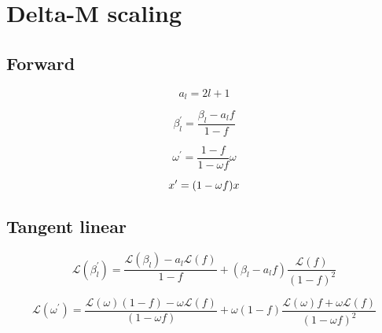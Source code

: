 %
\section{Delta-M scaling}
\label{sec:delta_m_scaling}


\subsection{Forward}
\label{sec:delta_m_scaling-forward}

\begin{equation}
a_{l} = 2 l + 1
\label{eq:delta_m_scaling-forward-a}
\end{equation}

\begin{equation}
\beta^{\prime}_{l} = \frac{\beta_{l} - a_{l}f}{1 - f}
\label{eq:delta_m_scaling-forward-chi}
\end{equation}

\begin{equation}
\omega^{\prime} = \frac{1 - f}{1 - {\omega}f}\omega
\label{eq:delta_m_scaling-forward-omega}
\end{equation}

\begin{equation}
x^{\prime} = (1 - {\omega}f)x
\label{eq:delta_m_scaling-forward-tau}
\end{equation}


%
\subsection{Tangent linear}
\label{sec:delta_m_scaling-tangent_linear}

\begin{equation}
\mathcal{L}(\beta^{\prime}_{l}) = \frac{\mathcal{L}(\beta_{l}) - a_{l}\mathcal{L}(f)}{1-f} + (\beta_{l} - a_{l}f) \frac{\mathcal{L}(f)}{(1-f)^{2}}
\label{eq:delta_m_scaling-tangent_linear-chi_l}
\end{equation}

\begin{equation}
\mathcal{L}(\omega^{\prime}) = \frac{\mathcal{L}(\omega)(1 - f) - \omega\mathcal{L}(f)}{(1- {\omega}f)} + \omega(1 - f) \frac{\mathcal{L}(\omega)f + \omega\mathcal{L}(f)}{(1- {\omega}f)^{2}}
\label{eq:delta_m_scaling-tangent_linear-omega_l}
\end{equation}

